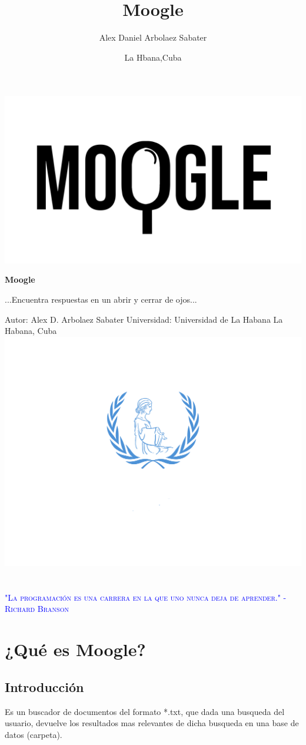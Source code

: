 \documentclass[12]{article}
\title{Moogle}
\author{Alex Daniel Arbolaez Sabater}
\date{La Hbana,Cuba}
\begin{document}
\begin{titlepage}
\centering
\includegraphics[width=1 \textwidth]{Moogle.png} 
\vspace{2cm}

{\Huge \textbf{Moogle} \par}
\vspace{0.5cm}
{\Large ...Encuentra respuestas en un abrir y cerrar de ojos...\par}
\vspace{1.5cm}

Autor: Alex D. Arbolaez Sabater
Universidad: Universidad de La Habana
La Habana, Cuba
\\
\includegraphics[width=0.3 \textwidth]{havmun01.png} 

\vfill

\end{titlepage}

\section{}\LARGE \textcolor{blue}{\textsc{"La programación es una carrera en la que uno nunca deja de aprender." - Richard Branson}}

\newpage
\tableofcontents
\newpage
\section{¿Qué es Moogle?}
\subsection{Introducción}
Es un buscador de documentos del formato *.txt, que dada una busqueda del usuario, 
devuelve los resultados mas relevantes de dicha busqueda en una base de datos (carpeta).
\\
\\
\end{document}
